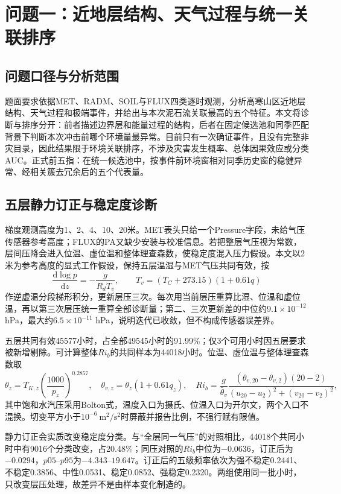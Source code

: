 \section{问题一：近地层结构、天气过程与统一关联排序}
\subsection{问题口径与分析范围}
题面要求依据MET、RADM、SOIL与FLUX四类逐时观测，分析高寒山区近地层结构、天气过程和极端事件，并给出与本次泥石流关联最高的五个特征。本文将诊断与排序分开：前者描述边界层和能量过程的结构，后者在固定候选池和同季匹配背景下判断本次冲击前哪个环境量最异常。目前只有一次确证事件，且没有完整非灾目录，因此结果限于环境关联排序，不涉及灾害发生概率、总体因果效应或分类AUC。正式前五指：在统一候选池中，按事件前环境窗相对同季历史窗的稳健异常、经相关簇去冗余后的五个代表量。

\subsection{五层静力订正与稳定度诊断}
梯度观测高度为1、2、4、10、20米。MET表头只给一个Pressure字段，未给气压传感器参考高度；FLUX的PA又缺少安装与校准信息。若把整层气压视为常数，层间压降会进入位温、虚位温和整体理查森数，使稳定度混入压力假设。本文以2米为参考高度的显式工作假设，保持五层温湿与MET气压共同有效，按
\begin{equation}
\frac{\mathrm d\log p}{\mathrm dz}=-\frac{g}{R_dT_v},\qquad
T_v=(T_C+273.15)(1+0.61q)
\end{equation}
作逆虚温分段梯形积分，更新层压三次。每次用当前层压重算比湿、位温和虚位温，再以第三次层压统一重算全部诊断量；第二、三次更新差的中位约$9.1\times10^{-12}$ hPa，最大约$6.5\times10^{-11}$ hPa，说明迭代已收敛，但不构成传感器误差界。

五层共同有效45577小时，占全部49545小时的91.99\%；仅3个可用小时因五层要求被新增剔除。可计算整体$Ri_b$的共同样本为44018小时。位温、虚位温与整体理查森数取
\begin{equation}
\theta_z=T_{K,z}\left(\frac{1000}{p_z}\right)^{0.2857},\quad
\theta_{v,z}=\theta_z(1+0.61q_z),\quad
Ri_b=\frac{g}{\bar\theta_v}
\frac{(\theta_{v,20}-\theta_{v,2})(20-2)}
{(u_{20}-u_2)^2+(v_{20}-v_2)^2},
\end{equation}
其中饱和水汽压采用Bolton式，温度入口为摄氏、位温入口为开尔文，两个入口不混换。切变平方小于$10^{-6}\ \mathrm{m^2/s^2}$时屏蔽并报告比例，不强行赋有限值。

静力订正会实质改变稳定度分类。与“全层同一气压”的对照相比，44018个共同小时中有9016个分类改变，占20.48\%；同压对照的$Ri_b$中位为$-0.0636$，订正后为$-0.0294$，$p05$--$p95$为$-4.343$--$19.647$。订正后的五级频率依次为强不稳定0.2441、不稳定0.3856、中性0.0531、稳定0.0852、强稳定0.2320。两组使用同一批小时，只改变层压处理，故差异不是由样本变化制造的。

